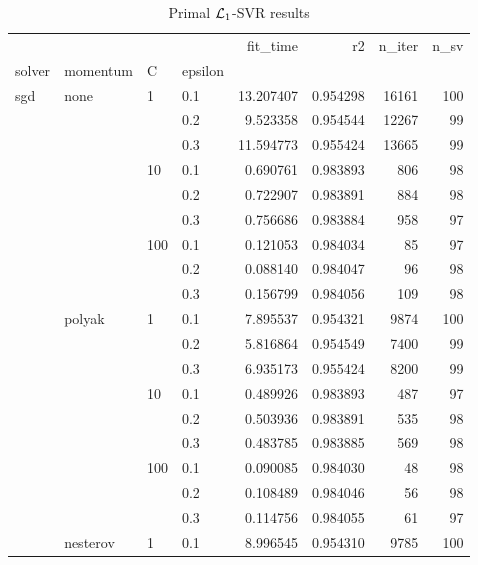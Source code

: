 \begin{table}[H]
\centering
\caption{Primal $\protect \mathcal{L}_1$-SVR results}
\label{primal_l1_svr_cv_results}
\begin{tabular}{llllrrrr}
\toprule
          &   &     &     &   fit\_time &        r2 &  n\_iter &  n\_sv \\
solver & momentum & C & epsilon &            &           &         &       \\
\midrule
sgd & none & 1   & 0.1 &  13.207407 &  0.954298 &   16161 &   100 \\
          &   &     & 0.2 &   9.523358 &  0.954544 &   12267 &    99 \\
          &   &     & 0.3 &  11.594773 &  0.955424 &   13665 &    99 \\
          &   & 10  & 0.1 &   0.690761 &  0.983893 &     806 &    98 \\
          &   &     & 0.2 &   0.722907 &  0.983891 &     884 &    98 \\
          &   &     & 0.3 &   0.756686 &  0.983884 &     958 &    97 \\
          &   & 100 & 0.1 &   0.121053 &  0.984034 &      85 &    97 \\
          &   &     & 0.2 &   0.088140 &  0.984047 &      96 &    98 \\
          &   &     & 0.3 &   0.156799 &  0.984056 &     109 &    98 \\
          & polyak & 1   & 0.1 &   7.895537 &  0.954321 &    9874 &   100 \\
          &   &     & 0.2 &   5.816864 &  0.954549 &    7400 &    99 \\
          &   &     & 0.3 &   6.935173 &  0.955424 &    8200 &    99 \\
          &   & 10  & 0.1 &   0.489926 &  0.983893 &     487 &    97 \\
          &   &     & 0.2 &   0.503936 &  0.983891 &     535 &    98 \\
          &   &     & 0.3 &   0.483785 &  0.983885 &     569 &    98 \\
          &   & 100 & 0.1 &   0.090085 &  0.984030 &      48 &    98 \\
          &   &     & 0.2 &   0.108489 &  0.984046 &      56 &    98 \\
          &   &     & 0.3 &   0.114756 &  0.984055 &      61 &    97 \\
          & nesterov & 1   & 0.1 &   8.996545 &  0.954310 &    9785 &   100 \\

\end{tabular}
\end{table}
